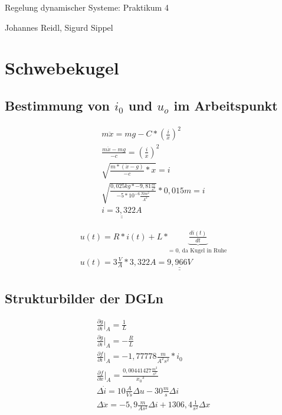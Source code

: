 \documentclass[10pt,a4paper]{article}
\begin{document}
\begin{center}
Regelung dynamischer Systeme: Praktikum 4

Johannes Reidl, Sigurd Sippel
\end{center}

\section{Schwebekugel}
\subsection{Bestimmung von $i_0$ und  $u_o$ im Arbeitspunkt}
\begin{figure}[H]
  \begin{align}
	  m\ddot{x} = mg - C * (\frac{i}{x})^2 \nonumber \\
	  \frac{m\ddot{x} - mg}{-c} = (\frac{i}{x})^2 \nonumber \\
	  \sqrt{\frac{m* (\ddot{x} - g)}{-c} * x} = i \nonumber \\
	  \sqrt{\frac{0,025kg * -9,81\frac{m}{s^2}}{-5 * 10^{-6}\frac{Nm^2}{A^2}}} * 0,015m = i \nonumber \\
	  \underline{\underline{i = 3,322A}} \nonumber
  \end{align}
\end{figure}

\begin{figure}[H]
  \begin{align}
	  u(t) = R * i(t) + L * \underbrace{\frac{di(t)}{dt}}_\text{= 0, da Kugel in Ruhe} \nonumber \\
	  u(t) = 3\frac{V}{A} * 3,322A = \underline{\underline{9,966V}} \nonumber
  \end{align}
\end{figure}

\subsection{Strukturbilder der DGLn}
\begin{figure}[H]
  \begin{align}
	  \frac{\partial g}{\partial i} \Big|_A = \frac{1}{L} \nonumber \\
	  \frac{\partial g}{\partial i} \Big|_A = -\frac{R}{L} \nonumber \\
	  \frac{\partial f}{\partial i} \Big|_A = -1,77778\frac{m}{A^2s^2} * i_0 \nonumber \\
	  \frac{\partial f}{\partial x} \Big|_A = \frac{0,00441427\frac{m^2}{s^2}}{{x_0}^3} \nonumber \\
	  \Delta \dot{i} = 10\frac{A}{Vs}\Delta u - 30 \frac{m}{s} \Delta i \nonumber \\
	  \Delta \ddot{x} = -5,9\frac{m}{As^2} \Delta i + 1306,4 \frac{1}{s^2} \Delta x
  \end{align}
\end{figure}
\end{document}
